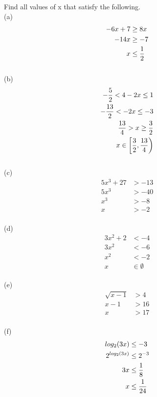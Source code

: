 \begin{exercise}\nonumber
	Find all values of x that satisfy the following. \\

	(a)
	\begin{align}
		-6x + 7 & \ge 8x          \\
		-14x    & \ge -7          \\
		x       & \le {1 \over 2}
	\end{align} \\

	(b)
	\begin{align}
		-{5 \over 2} < 4 - 2x \le 1      \\
		-{13 \over 2} < -2x \le -3       \\
		{13 \over 4} > x \ge {3 \over 2} \\
		x \in \left[{3 \over 2}, {13 \over 4}\right)
	\end{align} \\

	(c)
	\begin{align}
		5x^3 + 27 & > -13 \\
		5x^3      & > -40 \\
		x^3       & > -8  \\
		x         & > -2
	\end{align} \\

	(d)
	\begin{align}
		3x^2 + 2 & < -4          \\
		3x^2     & < -6          \\
		x^2      & < -2          \\
		x        & \in \emptyset
	\end{align} \\

	(e)
	\begin{align}
		\sqrt{x-1} & > 4  \\
		x - 1      & > 16 \\
		x          & > 17
	\end{align} \\

	(f)
	\begin{align}
		log_2(3x)     & \le -3           \\
		2^{log_2(3x)} & \le 2^{-3}       \\
		3x            & \le {1 \over 8}  \\
		x             & \le {1 \over 24}
	\end{align}
\end{exercise}

